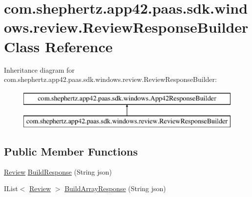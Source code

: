 \hypertarget{classcom_1_1shephertz_1_1app42_1_1paas_1_1sdk_1_1windows_1_1review_1_1_review_response_builder}{\section{com.\+shephertz.\+app42.\+paas.\+sdk.\+windows.\+review.\+Review\+Response\+Builder Class Reference}
\label{classcom_1_1shephertz_1_1app42_1_1paas_1_1sdk_1_1windows_1_1review_1_1_review_response_builder}
}
Inheritance diagram for com.\+shephertz.\+app42.\+paas.\+sdk.\+windows.\+review.\+Review\+Response\+Builder\+:\begin{figure}[H]
\begin{center}
\leavevmode
\includegraphics[height=2.000000cm]{classcom_1_1shephertz_1_1app42_1_1paas_1_1sdk_1_1windows_1_1review_1_1_review_response_builder}
\end{center}
\end{figure}
\subsection*{Public Member Functions}
\begin{DoxyCompactItemize}
\item 
\hyperlink{classcom_1_1shephertz_1_1app42_1_1paas_1_1sdk_1_1windows_1_1review_1_1_review}{Review} \hyperlink{classcom_1_1shephertz_1_1app42_1_1paas_1_1sdk_1_1windows_1_1review_1_1_review_response_builder_aee4592cb407a100f31afd97a1c1ffc7c}{Build\+Response} (String json)
\item 
I\+List$<$ \hyperlink{classcom_1_1shephertz_1_1app42_1_1paas_1_1sdk_1_1windows_1_1review_1_1_review}{Review} $>$ \hyperlink{classcom_1_1shephertz_1_1app42_1_1paas_1_1sdk_1_1windows_1_1review_1_1_review_response_builder_ab545ac68e258f783469fdc3b9ec7e8a9}{Build\+Array\+Response} (String json)
\end{DoxyCompactItemize}


